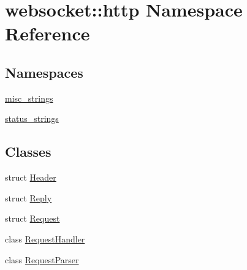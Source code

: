 \hypertarget{namespacewebsocket_1_1http}{}\section{websocket\+:\+:http Namespace Reference}
\label{namespacewebsocket_1_1http}
\subsection*{Namespaces}
\begin{DoxyCompactItemize}
\item 
 \hyperlink{namespacewebsocket_1_1http_1_1misc__strings}{misc\+\_\+strings}
\item 
 \hyperlink{namespacewebsocket_1_1http_1_1status__strings}{status\+\_\+strings}
\end{DoxyCompactItemize}
\subsection*{Classes}
\begin{DoxyCompactItemize}
\item 
struct \hyperlink{structwebsocket_1_1http_1_1Header}{Header}
\item 
struct \hyperlink{structwebsocket_1_1http_1_1Reply}{Reply}
\item 
struct \hyperlink{structwebsocket_1_1http_1_1Request}{Request}
\item 
class \hyperlink{classwebsocket_1_1http_1_1RequestHandler}{Request\+Handler}
\item 
class \hyperlink{classwebsocket_1_1http_1_1RequestParser}{Request\+Parser}
\end{DoxyCompactItemize}
